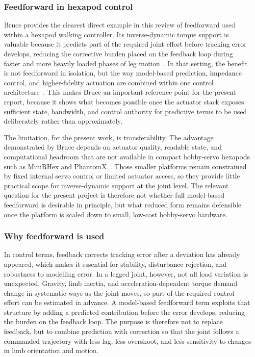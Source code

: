 \subsubsection{Feedforward in hexapod control}
Bruce provides the clearest direct example in this review of feedforward used within a hexapod walking controller. Its inverse-dynamic torque support is valuable because it predicts part of the required joint effort before tracking error develops, reducing the corrective burden placed on the feedback loop during faster and more heavily loaded phases of leg motion~\cite{steindl2020bruce}. In that setting, the benefit is not feedforward in isolation, but the way model-based prediction, impedance control, and higher-fidelity actuation are combined within one control architecture~\cite{steindl2020bruce}. This makes Bruce an important reference point for the present report, because it shows what becomes possible once the actuator stack exposes sufficient state, bandwidth, and control authority for predictive terms to be used deliberately rather than approximately.

The limitation, for the present work, is transferability. The advantage demonstrated by Bruce depends on actuator quality, readable state, and computational headroom that are not available in compact hobby-servo hexapods such as MiniRHex and PhantomX~\cite{barragan2018minirhex,interbotixphantomx,robotisax12a}. Those smaller platforms remain constrained by fixed internal servo control or limited actuator access, so they provide little practical scope for inverse-dynamic support at the joint level. The relevant question for the present project is therefore not whether full model-based feedforward is desirable in principle, but what reduced form remains defensible once the platform is scaled down to small, low-cost hobby-servo hardware.

\subsubsection{Why feedforward is used}
In control terms, feedback corrects tracking error after a deviation has already appeared, which makes it essential for stability, disturbance rejection, and robustness to modelling error. In a legged joint, however, not all load variation is unexpected. Gravity, limb inertia, and acceleration-dependent torque demand change in systematic ways as the joint moves, so part of the required control effort can be estimated in advance. A model-based feedforward term exploits that structure by adding a predicted contribution before the error develops, reducing the burden on the feedback loop. The purpose is therefore not to replace feedback, but to combine prediction with correction so that the joint follows a commanded trajectory with less lag, less overshoot, and less sensitivity to changes in limb orientation and motion.

